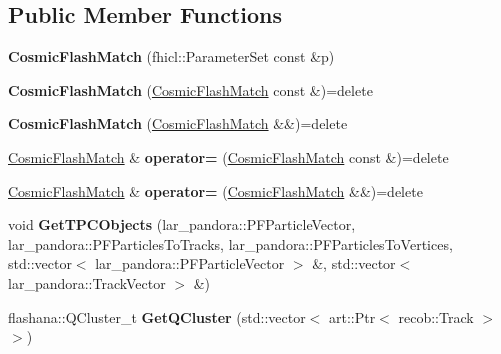 \subsection*{Public Member Functions}
\begin{DoxyCompactItemize}
\item 
\hypertarget{classCosmicFlashMatch_a1b3ff330c64a20c3dd3e22c35f130cc4}{{\bfseries Cosmic\-Flash\-Match} (fhicl\-::\-Parameter\-Set const \&p)}\label{classCosmicFlashMatch_a1b3ff330c64a20c3dd3e22c35f130cc4}

\item 
\hypertarget{classCosmicFlashMatch_ad422dc1c69902d22d950786d02fcc2fa}{{\bfseries Cosmic\-Flash\-Match} (\hyperlink{classCosmicFlashMatch}{Cosmic\-Flash\-Match} const \&)=delete}\label{classCosmicFlashMatch_ad422dc1c69902d22d950786d02fcc2fa}

\item 
\hypertarget{classCosmicFlashMatch_a30c798d9283fea4385cc6ee0ae934a5c}{{\bfseries Cosmic\-Flash\-Match} (\hyperlink{classCosmicFlashMatch}{Cosmic\-Flash\-Match} \&\&)=delete}\label{classCosmicFlashMatch_a30c798d9283fea4385cc6ee0ae934a5c}

\item 
\hypertarget{classCosmicFlashMatch_a259c740b9a09a2cef24fba0b883fb873}{\hyperlink{classCosmicFlashMatch}{Cosmic\-Flash\-Match} \& {\bfseries operator=} (\hyperlink{classCosmicFlashMatch}{Cosmic\-Flash\-Match} const \&)=delete}\label{classCosmicFlashMatch_a259c740b9a09a2cef24fba0b883fb873}

\item 
\hypertarget{classCosmicFlashMatch_ada80618ce3d9ac661515e0af6369cd81}{\hyperlink{classCosmicFlashMatch}{Cosmic\-Flash\-Match} \& {\bfseries operator=} (\hyperlink{classCosmicFlashMatch}{Cosmic\-Flash\-Match} \&\&)=delete}\label{classCosmicFlashMatch_ada80618ce3d9ac661515e0af6369cd81}

\item 
\hypertarget{classCosmicFlashMatch_a8368e7181e2336eb079cb678113b3911}{void {\bfseries Get\-T\-P\-C\-Objects} (lar\-\_\-pandora\-::\-P\-F\-Particle\-Vector, lar\-\_\-pandora\-::\-P\-F\-Particles\-To\-Tracks, lar\-\_\-pandora\-::\-P\-F\-Particles\-To\-Vertices, std\-::vector$<$ lar\-\_\-pandora\-::\-P\-F\-Particle\-Vector $>$ \&, std\-::vector$<$ lar\-\_\-pandora\-::\-Track\-Vector $>$ \&)}\label{classCosmicFlashMatch_a8368e7181e2336eb079cb678113b3911}

\item 
\hypertarget{classCosmicFlashMatch_a04fb198244e86fbd2cb6c6f6a0ef1363}{flashana\-::\-Q\-Cluster\-\_\-t {\bfseries Get\-Q\-Cluster} (std\-::vector$<$ art\-::\-Ptr$<$ recob\-::\-Track $>$$>$)}\label{classCosmicFlashMatch_a04fb198244e86fbd2cb6c6f6a0ef1363}


\end{DoxyCompactItemize}
